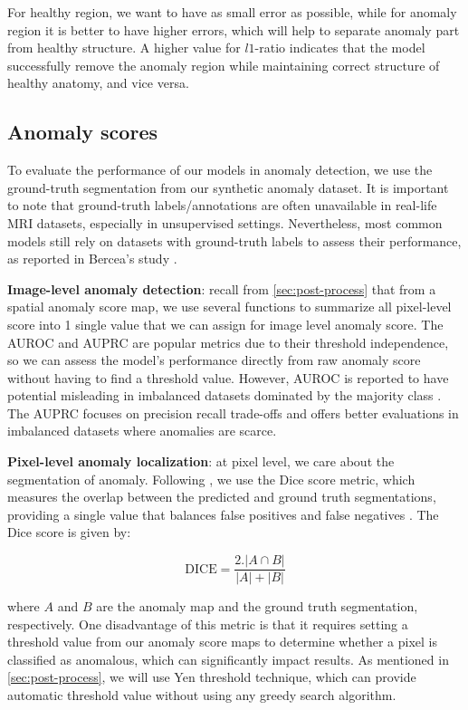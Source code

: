 For healthy region, we want to have as small error as possible, while for anomaly region it is better to have higher errors, which will help to separate anomaly part from healthy structure. A higher value for $l1$-ratio indicates that the model successfully remove the anomaly region while maintaining correct structure of healthy anatomy, and vice versa. 

\subsection{Anomaly scores}

To evaluate the performance of our models in anomaly detection, we use the ground-truth segmentation from our synthetic anomaly dataset. It is important to note that ground-truth labels/annotations are often unavailable in real-life MRI datasets, especially in unsupervised settings. Nevertheless, most common models still rely on datasets with ground-truth labels to assess their performance, as reported in Bercea’s study \cite{berceaDDPMforMedicalImagesStudy2024}.

\textbf{Image-level anomaly detection}: recall from \cref{sec:post-process} that from a spatial anomaly score map, we use several functions to summarize all pixel-level score into 1 single value that we can assign for image level anomaly score. The AUROC and AUPRC are popular metrics \cite{wu2024maskdiffusionposteriorMDPS, behrendt2025cDDPM, DDAD, wangEPDiffErasurePerception2025} due to their threshold independence, so we can assess the model's performance directly from raw anomaly score without having to find a threshold value. However, AUROC is reported to have potential misleading in imbalanced datasets dominated by the majority class \cite{berceaDDPMforMedicalImagesStudy2024}. The AUPRC focuses on precision recall trade-offs and offers better evaluations in imbalanced datasets where anomalies are scarce. 

\textbf{Pixel-level anomaly localization}: at pixel level, we care about the segmentation of anomaly. Following \cite{behrendt2025cDDPM, wangEPDiffErasurePerception2025}, we use the Dice score metric, which measures the overlap between the predicted and ground truth segmentations, providing a single value that balances false positives and false negatives \cite{berceaDDPMforMedicalImagesStudy2024}. The Dice score is given by: 

\begin{equation}
    \label{eq:dice-score}
    \mathrm{DICE} = \frac{2. |A \cap B|}{|A| + |B|}
\end{equation}

where $A$ and $B$ are the anomaly map and the ground truth segmentation, respectively. One disadvantage of this metric is that it requires setting a threshold value from our anomaly score maps to determine whether a pixel is classified as anomalous, which can significantly impact results. As mentioned in \cref{sec:post-process}, we will use Yen threshold technique, which can provide automatic threshold value without using any greedy search algorithm.  